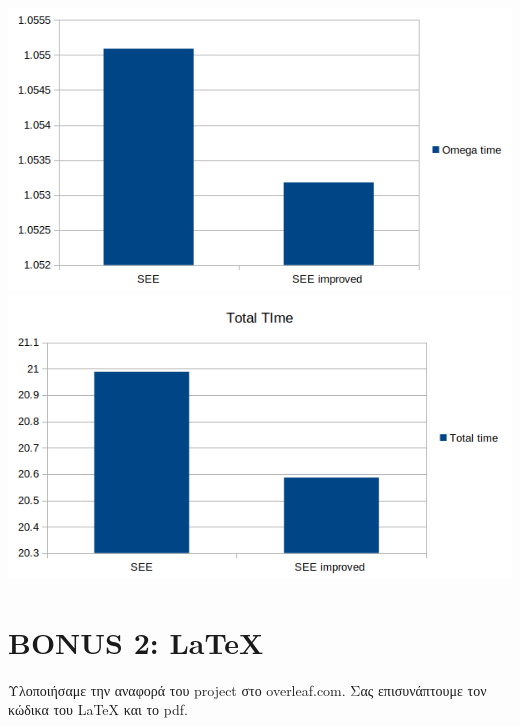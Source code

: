 \documentclass{FR16}
\begin{document}
\includegraphics[]{images/first_char_bonus.png}\hspace*{\fill}\newline
\includegraphics[]{images/second_char_bonus.png}\hspace*{\fill}
\newpage

\section{BONUS 2: LaTeX}
Υλοποιήσαμε την αναφορά του project στο overleaf.com. Σας επισυνάπτουμε τον κώδικα του LaTeX και το pdf.
\end{document}
